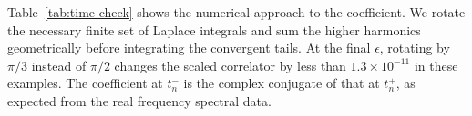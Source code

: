 Table~\ref{tab:time-check} shows the numerical approach to the
coefficient. We rotate the necessary finite set of Laplace integrals
and sum the higher harmonics geometrically before integrating the
convergent tails. At the final \(\epsilon\), rotating by \(\pi/3\)
instead of \(\pi/2\) changes the scaled correlator by less than
\(1.3\times10^{-11}\) in these examples. The coefficient at
\(t_n^-\) is the complex conjugate of that at \(t_n^+\), as
expected from the real frequency spectral data.
